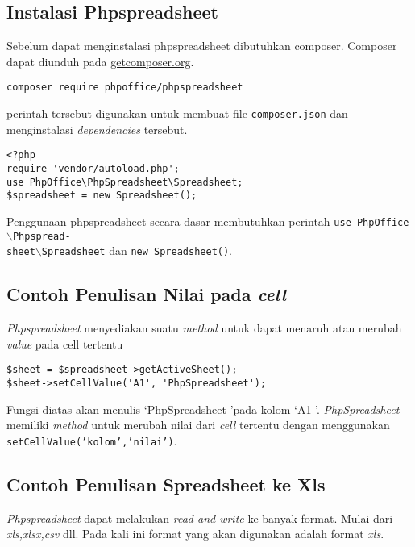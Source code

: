 \subsection{Instalasi Phpspreadsheet}
Sebelum dapat menginstalasi phpspreadsheet dibutuhkan composer. Composer dapat diunduh pada \url{getcomposer.org}. 


\begin{lstlisting}
composer require phpoffice/phpspreadsheet
\end{lstlisting}

perintah tersebut digunakan untuk membuat file \texttt{composer.json} dan menginstalasi \textit{dependencies} tersebut. 


\begin{lstlisting}
<?php
require 'vendor/autoload.php';
use PhpOffice\PhpSpreadsheet\Spreadsheet;
$spreadsheet = new Spreadsheet();
\end{lstlisting}


Penggunaan phpspreadsheet secara dasar membutuhkan perintah \texttt{use PhpOffice$\backslash$Phpspread-\\sheet$\backslash$Spreadsheet} dan \texttt{new Spreadsheet()}.

\subsection{Contoh Penulisan Nilai pada \textit{cell}}

\textit{Phpspreadsheet} menyediakan suatu \textit{method} untuk dapat menaruh atau merubah \textit{value} pada cell tertentu

\begin{lstlisting}
$sheet = $spreadsheet->getActiveSheet();
$sheet->setCellValue('A1', 'PhpSpreadsheet');
\end{lstlisting}

 Fungsi diatas akan menulis \lq PhpSpreadsheet \rq pada kolom \lq A1 \rq . \textit{PhpSpreadsheet} memiliki \textit{method} untuk merubah nilai dari \textit{cell} tertentu dengan menggunakan \texttt{setCellValue('kolom','nilai')}.


\subsection{Contoh Penulisan Spreadsheet ke Xls }

\textit{Phpspreadsheet} dapat melakukan \textit{read and write} ke banyak format. Mulai dari \textit{xls,xlsx,csv} dll. Pada kali ini format yang akan digunakan adalah format  \textit{xls}.

